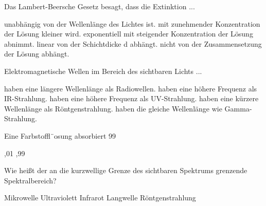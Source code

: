 \documentclass[11pt]{exam}
\begin{document}
\setlength{\voffset}{-0.5in}
\setlength{\headsep}{5pt}

\hspace{2mm}
 \hspace{5mm}
\vspace{4mm}

\begin{questions}

\question Das Lambert-Beersche Gesetz besagt, dass die Extinktion ...

\begin{choices}
	\choice unabhängig von der Wellenlänge des Lichtes ist.
	\choice mit zunehmender Konzentration der Lösung kleiner wird.
	\choice exponentiell mit steigender Konzentration der Lösung abnimmt.
	\choice linear von der Schichtdicke d abhängt.
	\choice nicht von der Zusammensetzung der Lösung abhängt.
\end{choices}

\vspace{3mm}\question Elektromagnetische Wellen im Bereich des sichtbaren Lichts ...

\begin{choices}
	\choice haben eine längere Wellenlänge als Radiowellen.
	\choice haben eine höhere Frequenz als IR-Strahlung.
	\choice haben eine höhere Frequenz als UV-Strahlung.
	\choice haben eine kürzere Wellenlänge als Röntgenstrahlung.
	\choice haben die gleiche Wellenlänge wie Gamma-Strahlung.
\end{choices}

\vspace{3mm}\question Eine Farbstoffl¨osung absorbiert 99 %

\begin{choices}
	,01
	,99
\end{choices}

\vspace{3mm}\question Wie heißt der an die kurzwellige Grenze des sichtbaren Spektrums grenzende Spektralbereich?

\begin{choices}
	\choice Mikrowelle
	\choice Ultraviolett
	\choice Infrarot
	\choice Langwelle
	\choice Röntgenstrahlung
\end{choices}


\end{questions}
\end{document}
